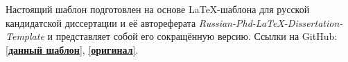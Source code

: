 Настоящий шаблон подготовлен на основе LaTeX-шаблона для русской кандидатской диссертации и её автореферата \textit{Russian-Phd-LaTeX-Dissertation-Template} и представляет собой его сокращённую версию. Ссылки на GitHub: \href{https://github.com/aa-savelyev/Diploma_MIPT_template}{[\textbf{данный шаблон}]}, \href{https://github.com/AndreyAkinshin/Russian-Phd-LaTeX-Dissertation-Template}{[\textbf{оригинал}]}.

\newpage
